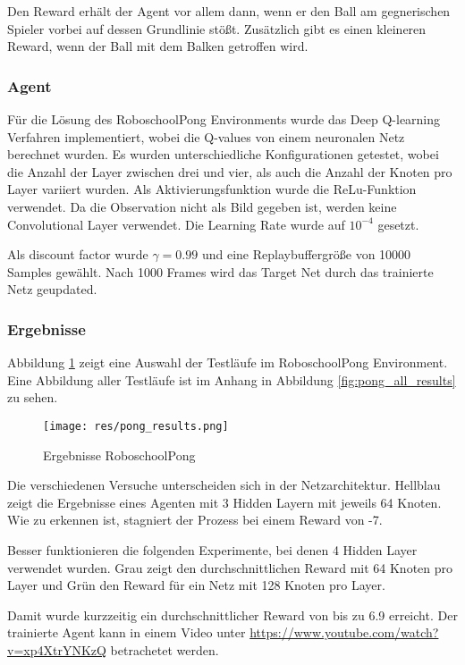 \documentclass[11pt]{scrartcl}
\begin{document}
Den Reward erhält der Agent vor allem dann, wenn er den Ball am gegnerischen Spieler vorbei
auf dessen Grundlinie stößt. Zusätzlich gibt es einen kleineren Reward, wenn der Ball mit
dem Balken getroffen wird.

\subsubsection{Agent}
Für die Lösung des RoboschoolPong Environments wurde das Deep Q-learning Verfahren implementiert,
wobei die Q-values von einem neuronalen Netz berechnet wurden. Es wurden unterschiedliche
Konfigurationen getestet, wobei die Anzahl der Layer zwischen drei und vier, als auch die
Anzahl der Knoten pro Layer variiert wurden. Als Aktivierungsfunktion wurde die
ReLu-Funktion verwendet. Da die Observation nicht als Bild gegeben ist, werden keine
Convolutional Layer verwendet. Die Learning Rate wurde auf $10^{-4}$ gesetzt.

Als discount factor wurde $\gamma = 0.99$ und eine Replaybuffergröße von 10000
Samples gewählt. Nach 1000 Frames wird das Target Net durch das trainierte Netz geupdated.

\subsubsection{Ergebnisse}
Abbildung \ref{fig:pong_results} zeigt eine Auswahl der Testläufe im RoboschoolPong Environment.
Eine Abbildung aller Testläufe ist im Anhang in Abbildung \ref{fig:pong_all_results} zu
sehen.

\begin{figure}[htp]
\centering
\texttt{[image: res/pong\_results.png]}
\caption{Ergebnisse RoboschoolPong}
\label{fig:pong_results}
\end{figure}
\noindent
Die verschiedenen Versuche unterscheiden sich in der Netzarchitektur. Hellblau zeigt die
Ergebnisse eines Agenten mit 3 Hidden Layern mit jeweils 64 Knoten. Wie zu erkennen ist,
stagniert der Prozess bei einem Reward von -7.

Besser funktionieren die folgenden Experimente, bei denen 4 Hidden Layer verwendet wurden.
Grau zeigt den durchschnittlichen Reward mit 64 Knoten pro Layer und Grün den Reward für
ein Netz mit 128 Knoten pro Layer.

Damit wurde kurzzeitig ein durchschnittlicher Reward von bis zu 6.9 erreicht. Der
trainierte Agent kann in einem Video unter \url{https://www.youtube.com/watch?v=xp4XtrYNKzQ}
betrachetet werden.
\end{document}

